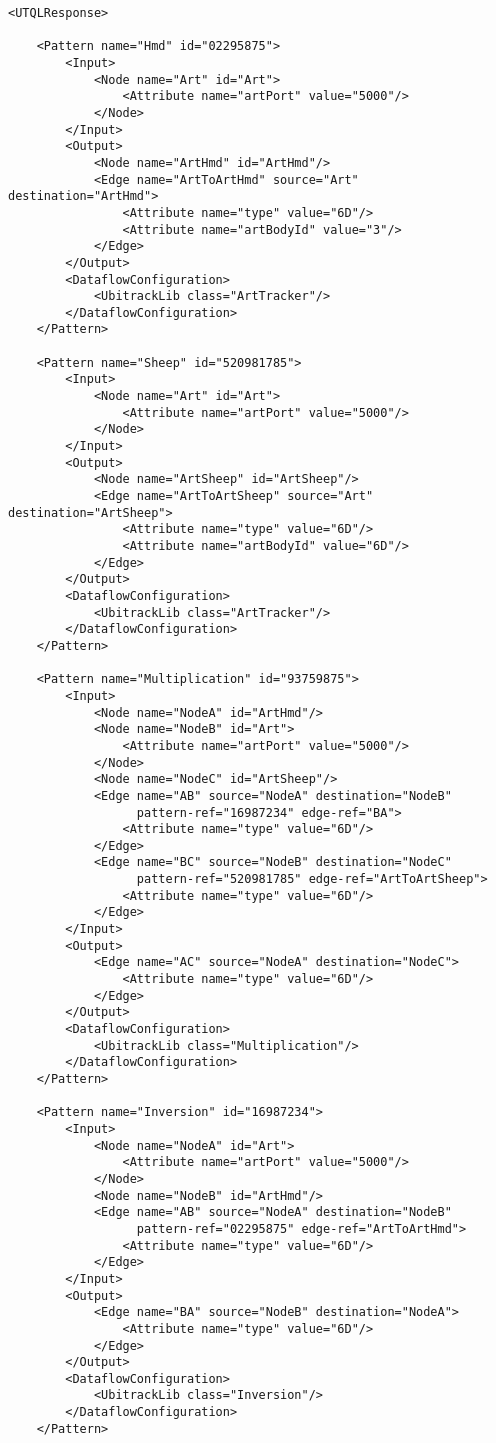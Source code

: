 \documentclass[11pt]{article}
\begin{document}
\begin{Verbatim}[fontsize=\footnotesize,tabsize=2] 
<UTQLResponse>

    <Pattern name="Hmd" id="02295875">
        <Input>
            <Node name="Art" id="Art">
                <Attribute name="artPort" value="5000"/>
            </Node>
        </Input>
        <Output>
            <Node name="ArtHmd" id="ArtHmd"/>
            <Edge name="ArtToArtHmd" source="Art" destination="ArtHmd">
                <Attribute name="type" value="6D"/>
                <Attribute name="artBodyId" value="3"/>
            </Edge>
        </Output>
        <DataflowConfiguration>
            <UbitrackLib class="ArtTracker"/>
        </DataflowConfiguration>
    </Pattern>

    <Pattern name="Sheep" id="520981785">
        <Input>
            <Node name="Art" id="Art">
                <Attribute name="artPort" value="5000"/>
            </Node>
        </Input>
        <Output>
            <Node name="ArtSheep" id="ArtSheep"/>
            <Edge name="ArtToArtSheep" source="Art" destination="ArtSheep">
                <Attribute name="type" value="6D"/>
                <Attribute name="artBodyId" value="6D"/>
            </Edge>
        </Output>
        <DataflowConfiguration>
            <UbitrackLib class="ArtTracker"/>
        </DataflowConfiguration>
    </Pattern>

    <Pattern name="Multiplication" id="93759875">
        <Input>
            <Node name="NodeA" id="ArtHmd"/>
            <Node name="NodeB" id="Art">
                <Attribute name="artPort" value="5000"/>
            </Node>
            <Node name="NodeC" id="ArtSheep"/>
            <Edge name="AB" source="NodeA" destination="NodeB"
                  pattern-ref="16987234" edge-ref="BA">
                <Attribute name="type" value="6D"/>
            </Edge>
            <Edge name="BC" source="NodeB" destination="NodeC"
                  pattern-ref="520981785" edge-ref="ArtToArtSheep">
                <Attribute name="type" value="6D"/>
            </Edge>
        </Input>
        <Output>
            <Edge name="AC" source="NodeA" destination="NodeC">
                <Attribute name="type" value="6D"/>
            </Edge>
        </Output>
        <DataflowConfiguration>
            <UbitrackLib class="Multiplication"/>
        </DataflowConfiguration>
    </Pattern>

    <Pattern name="Inversion" id="16987234">
        <Input>
            <Node name="NodeA" id="Art">
                <Attribute name="artPort" value="5000"/>
            </Node>
            <Node name="NodeB" id="ArtHmd"/>
            <Edge name="AB" source="NodeA" destination="NodeB"
                  pattern-ref="02295875" edge-ref="ArtToArtHmd">
                <Attribute name="type" value="6D"/>
            </Edge>
        </Input>
        <Output>
            <Edge name="BA" source="NodeB" destination="NodeA">
                <Attribute name="type" value="6D"/>
            </Edge>
        </Output>
        <DataflowConfiguration>
            <UbitrackLib class="Inversion"/>
        </DataflowConfiguration>
    </Pattern>


\end{Verbatim}
\end{document}
